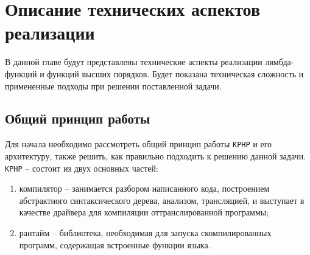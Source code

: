 
\chapter{Описание технических аспектов реализации}
В данной главе будут представлены технические аспекты реализации лямбда-функций и функций высших порядков.
Будет показана техническая сложность и примененные подходы при решении поставленной задачи.

\section{Общий принцип работы}
Для начала необходимо рассмотреть общий принцип работы \verb|KPHP| и его архитектуру, также решить, как правильно подходить к решению данной задачи.
\verb|KPHP| -- состоит из двух основных частей:
\begin{enumerate}
  \item компилятор -- занимается разбором написанного кода, построением абстрактного синтаксического дерева, анализом, трансляцией, и выступает в качестве драйвера для компиляции оттранслированной программы;
  \item рантайм -- библиотека, необходимая для запуска скомпилированных программ, содержащая встроенные функции языка.
\end{enumerate}


